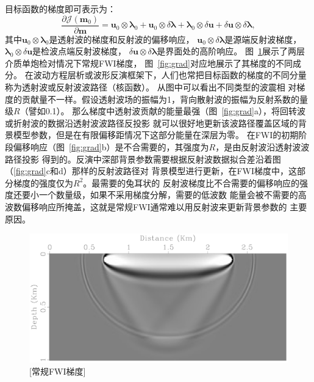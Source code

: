目标函数的梯度即可表示为：
\begin{equation}
	\frac{\partial\mathcal{J}(\mathbf{m}_0)}{\partial\mathbf{m}} = \mathbf{u}_0\otimes\mathbf{\lambda}_0
	+\mathbf{u}_0\otimes\delta\mathbf{\lambda}+\mathbf{\lambda}_0\otimes\delta\mathbf{u}
	+\delta\mathbf{u}\otimes\delta\mathbf{\lambda},
	\label{eq:grad_ch3}
\end{equation}
其中$\mathbf{u}_0\otimes\mathbf{\lambda}_0$是透射波的梯度和反射波的偏移响应，
$\mathbf{u}_0\otimes\delta\mathbf{\lambda}$是源端反射波梯度，
$\mathbf{\lambda}_0\otimes\delta\mathbf{u}$是检波点端反射波梯度，
$\delta\mathbf{u}\otimes\delta\mathbf{\lambda}$是界面处的高阶响应。
图~\ref{fig:grad_full}展示了两层介质单炮检对情况下常规FWI梯度，
图~\ref{fig:grad}对应地展示了其梯度的不同成分。
在波动方程层析或波形反演框架下，人们也常把目标函数的梯度的不同分量称为透射波或反射波波路径（核函数）。
从图中可以看出不同类型的波震相
对梯度的贡献量不一样。假设透射波场的振幅为1，背向散射波的振幅为反射系数的量级$R$（譬如0.1）。
那么梯度中透射波贡献的能量最强（图~\ref{fig:grad}a），将回转波或折射波的数据沿透射波波路径反投影
就可以很好地更新该波路径覆盖区域的背景模型参数，但是在有限偏移距情况下这部分能量在深层为零。
在FWI的初期阶段偏移响应（图~\ref{fig:grad}b）是不合需要的，其强度为$R$，是由反射波沿透射波波路径投影
得到的。反演中深部背景参数需要根据反射波数据拟合差沿着图（\ref{fig:grad}c和d）那样的反射波路径对
背景模型进行更新，在FWI梯度中，这部分梯度的强度仅为$R^2$。最需要的兔耳状的
反射波梯度比不合需要的偏移响应的强度还要小一个数量级，如果不采用梯度分解，需要的低波数
能量会被不需要的高波数偏移响应所掩盖，这就是常规FWI通常难以用反射波来更新背景参数的
主要原因。

\begin{figure}[!htbp]
	\centering
	\includegraphics[width=0.95\linewidth]{figure/grad_full}
	[常规FWI梯度]
	\label{fig:grad_full}
\end{figure}

